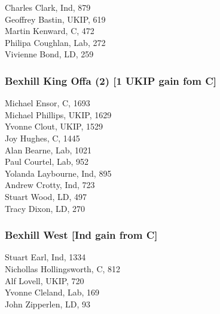 \documentclass[a4paper,openany,10pt]{book}
\begin{document}


Charles Clark, Ind, 879\\
Geoffrey Bastin, UKIP, 619\\
Martin Kenward, C, 472\\
Philipa Coughlan, Lab, 272\\
Vivienne Bond, LD, 259\\


\subsubsection*{Bexhill King Offa (2) \hspace*{\fill}\nolinebreak[1]%
\enspace\hspace*{\fill}
[1 UKIP gain fom C]}



Michael Ensor, C, 1693\\
Michael Phillips, UKIP, 1629\\
Yvonne Clout, UKIP, 1529\\
Joy Hughes, C, 1445\\
Alan Bearne, Lab, 1021\\
Paul Courtel, Lab, 952\\
Yolanda Laybourne, Ind, 895\\
Andrew Crotty, Ind, 723\\
Stuart Wood, LD, 497\\
Tracy Dixon, LD, 270\\


\subsubsection*{Bexhill West \hspace*{\fill}\nolinebreak[1]%
\enspace\hspace*{\fill}
[Ind gain from C]}



Stuart Earl, Ind, 1334\\
Nichollas Hollingsworth, C, 812\\
Alf Lovell, UKIP, 720\\
Yvonne Cleland, Lab, 169\\
John Zipperlen, LD, 93\\
\end{document}
